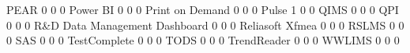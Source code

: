 \documentclass{article}
\begin{document}
\begin{Schunk}
\begin{Soutput}
  PEAR                                       0       0                        0
  Power BI                                   0       0                        0
  Print on Demand                            0       0                        0
  Pulse                                      1       0                        0
  QIMS                                       0       0                        0
  QPI                                        0       0                        0
  R&D Data Management Dashboard              0       0                        0
  Reliasoft Xfmea                            0       0                        0
  RSLMS                                      0       0                        0
  SAS                                        0       0                        0
  TestComplete                               0       0                        0
  TODS                                       0       0                        0
  TrendReader                                0       0                        0
  WWLIMS                                     0       0                        0
                                          

\end{Soutput}
\end{Schunk}
\end{document}

